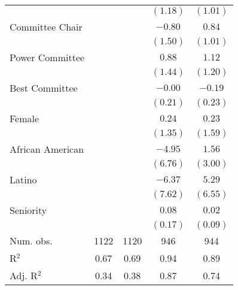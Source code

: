 \documentclass[12pt]{article}
\begin{document}
\begin{table}[!htbp]
{\begin{threeparttable}
\begin{tabular}{l c c c c }
                          &               &            & $(1.18)$     & $(1.01)$     \\
Committee Chair           &               &            & $-0.80$      & $0.84$       \\
                          &               &            & $(1.50)$     & $(1.01)$     \\
Power Committee           &               &            & $0.88$       & $1.12$       \\
                          &               &            & $(1.44)$     & $(1.20)$     \\
Best Committee            &               &            & $-0.00$      & $-0.19$      \\
                          &               &            & $(0.21)$     & $(0.23)$     \\
Female                    &               &            & $0.24$       & $0.23$       \\
                          &               &            & $(1.35)$     & $(1.59)$     \\
African American          &               &            & $-4.95$      & $1.56$       \\
                          &               &            & $(6.76)$     & $(3.00)$     \\
Latino                    &               &            & $-6.37$      & $5.29$       \\
                          &               &            & $(7.62)$     & $(6.55)$     \\
Seniority                 &               &            & $0.08$       & $0.02$       \\
                          &               &            & $(0.17)$     & $(0.09)$     \\
\hline
Num. obs.                 & 1122          & 1120       & 946          & 944          \\
R$^2$%
& 0.67          & 0.69       & 0.94         & 0.89         \\
Adj. R$^2$%
& 0.34          & 0.38       & 0.87         & 0.74         \\


\end{tabular}
\end{threeparttable}}
\end{table}
\end{document}
